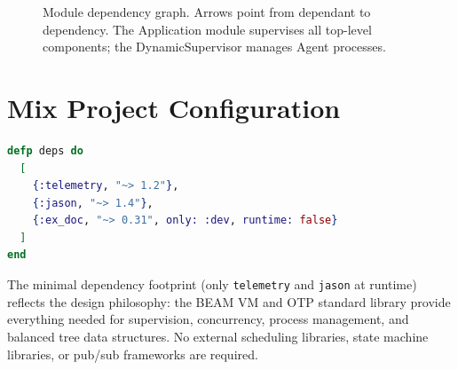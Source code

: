 \documentclass[12pt,a4paper]{article}
\theoremstyle{definition}
\theoremstyle{remark}
\begin{document}
\begin{figure}[H]
\centering
{}
\caption{Module dependency graph. Arrows point from dependant to dependency. The Application module supervises all top-level components; the DynamicSupervisor manages Agent processes.}\label{fig:module-deps}
\end{figure}

\section{Mix Project Configuration}\label{app:mix}

\begin{lstlisting}[language=elixir, caption={Project dependencies (\texttt{mix.exs})}, label={lst:mix}]
defp deps do
  [
    {:telemetry, "~> 1.2"},
    {:jason, "~> 1.4"},
    {:ex_doc, "~> 0.31", only: :dev, runtime: false}
  ]
end
\end{lstlisting}

The minimal dependency footprint (only \texttt{telemetry} and \texttt{jason} at runtime) reflects the design philosophy: the BEAM VM and OTP standard library provide everything needed for supervision, concurrency, process management, and balanced tree data structures. No external scheduling libraries, state machine libraries, or pub/sub frameworks are required.
\end{document}
